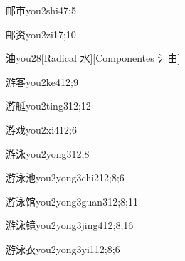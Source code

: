 \begin{verbete}{邮市}{you2shi4}{7;5}
\end{verbete}

\begin{verbete}{邮资}{you2zi1}{7;10}
\end{verbete}

\begin{verbete}{油}{you2}{8}[Radical 水][Componentes 氵由]
\end{verbete}

\begin{verbete}{游客}{you2ke4}{12;9}
\end{verbete}

\begin{verbete}{游艇}{you2ting3}{12;12}
\end{verbete}

\begin{verbete}{游戏}{you2xi4}{12;6}
\end{verbete}

\begin{verbete}{游泳}{you2yong3}{12;8}
\end{verbete}

\begin{verbete}{游泳池}{you2yong3chi2}{12;8;6}
\end{verbete}

\begin{verbete}{游泳馆}{you2yong3guan3}{12;8;11}
\end{verbete}

\begin{verbete}{游泳镜}{you2yong3jing4}{12;8;16}
\end{verbete}

\begin{verbete}{游泳衣}{you2yong3yi1}{12;8;6}
\end{verbete}

